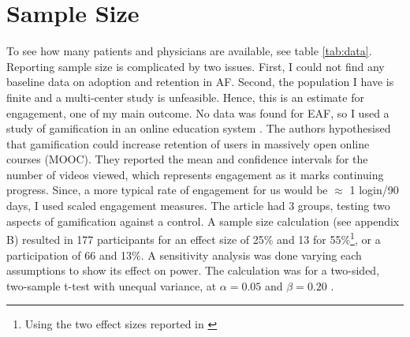 \section{Sample Size}
To see how many patients and physicians are available, see table \ref{tab:data}. Reporting sample size is complicated by two issues. First, I could not find any baseline data on adoption and retention in \gls{AF}. Second, the population I have is finite and a multi-center study is unfeasible. Hence, this is an estimate for engagement, one of my main outcome. No data was found for \gls{EAF}, so I used a study of gamification in an online education system  \cite{krause2015playful}. The authors hypothesised that gamification could increase retention of users in massively open online courses (MOOC). They reported the mean and confidence intervals for the number of videos viewed, which represents engagement as it marks continuing progress. Since, a more typical rate of engagement for us would be $\approx$ 1 login/90 days, I used scaled engagement measures. The article had 3 groups, testing two aspects of gamification against a control. A sample size calculation (see appendix B) resulted in 177 participants for an effect size of 25\% and 13 for 55\%\footnote{Using the two effect sizes reported in \cite{lachin1981introduction}}, or a participation of 66 and 13\%. A sensitivity analysis was done varying each assumptions to show its effect on power. The calculation was for a two-sided, two-sample t-test with unequal variance, at $\alpha = 0.05$ and $\beta = 0.20$ \cite{lachin1981introduction}.

